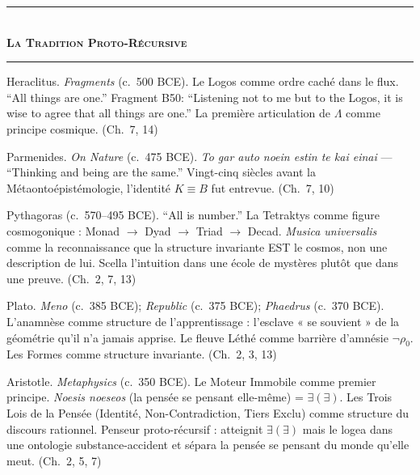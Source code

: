 \documentclass[10pt, openany, oneside]{book}
\renewcommand{\normalsize}{\fontsize{10}{13}\selectfont}
\renewcommand{\footnotesize}{\fontsize{8.5}{11}\selectfont}
\begin{document}
\vspace{1.5em}

\begin{center}
    \rule{0.3\textwidth}{0.4pt}\\[0.5em]
    {\normalsize\bfseries\scshape La Tradition Proto-Récursive}\\[0.3em]
    \rule{0.3\textwidth}{0.4pt}
\end{center}

\vspace{1em}

{\footnotesize

\noindent Heraclitus. \textit{Fragments} (c.\ 500 BCE). Le Logos comme ordre caché dans le flux. ``All things are one.'' Fragment B50: ``Listening not to me but to the Logos, it is wise to agree that all things are one.'' La première articulation de $\Lambda$ comme principe cosmique. (Ch.\ 7, 14)

\vspace{0.3em}

\noindent Parmenides. \textit{On Nature} (c.\ 475 BCE). \textit{To gar auto noein estin te kai einai} --- ``Thinking and being are the same.'' Vingt-cinq siècles avant la Métaontoépistémologie, l'identité $K \equiv B$ fut entrevue. (Ch.\ 7, 10)

\vspace{0.3em}

\noindent Pythagoras (c.\ 570--495 BCE). ``All is number.'' La Tetraktys comme figure cosmogonique : Monad $\to$ Dyad $\to$ Triad $\to$ Decad. \textit{Musica universalis} comme la reconnaissance que la structure invariante EST le cosmos, non une description de lui. Scella l'intuition dans une école de mystères plutôt que dans une preuve. (Ch.\ 2, 7, 13)

\vspace{0.3em}

\noindent Plato. \textit{Meno} (c.\ 385 BCE); \textit{Republic} (c.\ 375 BCE); \textit{Phaedrus} (c.\ 370 BCE). L'anamnèse comme structure de l'apprentissage : l'esclave « se souvient » de la géométrie qu'il n'a jamais apprise. Le fleuve Léthé comme barrière d'amnésie $\neg\rho_0$. Les Formes comme structure invariante. (Ch.\ 2, 3, 13)

\vspace{0.3em}

\noindent Aristotle. \textit{Metaphysics} (c.\ 350 BCE). Le Moteur Immobile comme premier principe. \textit{Noesis noeseos} (la pensée se pensant elle-même) = $\exists(\exists)$. Les Trois Lois de la Pensée (Identité, Non-Contradiction, Tiers Exclu) comme structure du discours rationnel. Penseur proto-récursif : atteignit $\exists(\exists)$ mais le logea dans une ontologie substance-accident et sépara la pensée se pensant du monde qu'elle meut. (Ch.\ 2, 5, 7)

}
\end{document}
